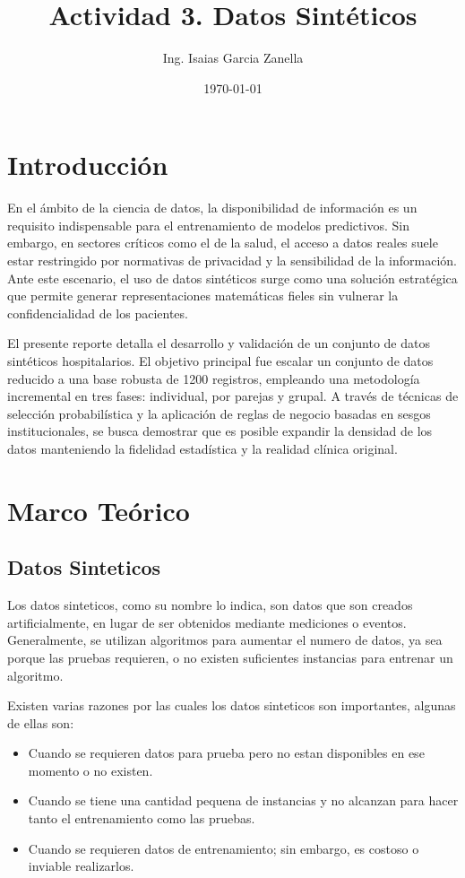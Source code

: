 \documentclass[12pt]{article}
\title{Actividad 3. Datos Sintéticos}
\author{Ing. Isaias Garcia Zanella}
\date{\today}
\begin{document}
\maketitle

\section{Introducción}
En el ámbito de la ciencia de datos, la disponibilidad de información es un requisito indispensable para el entrenamiento de modelos predictivos. Sin embargo, en sectores críticos como el de la salud, el acceso a datos reales suele estar restringido por normativas de privacidad y la sensibilidad de la información. Ante este escenario, el uso de datos sintéticos surge como una solución estratégica que permite generar representaciones matemáticas fieles sin vulnerar la confidencialidad de los pacientes.

El presente reporte detalla el desarrollo y validación de un conjunto de datos sintéticos hospitalarios. El objetivo principal fue escalar un conjunto de datos reducido a una base robusta de 1200 registros, empleando una metodología incremental en tres fases: individual, por parejas y grupal. A través de técnicas de selección probabilística y la aplicación de reglas de negocio basadas en sesgos institucionales, se busca demostrar que es posible expandir la densidad de los datos manteniendo la fidelidad estadística y la realidad clínica original.

\section{Marco Teórico}
\subsection{Datos Sinteticos}
    Los datos sinteticos, como su nombre lo indica, son datos que son creados artificialmente, en lugar
de ser obtenidos mediante mediciones o eventos. Generalmente, se utilizan algoritmos para aumentar el numero 
de datos, ya sea porque las pruebas requieren, o no existen suficientes instancias para entrenar un algoritmo.

Existen varias razones por las cuales los datos sinteticos son importantes, algunas de ellas son:
\begin{itemize}
    \item Cuando se requieren datos para prueba pero no estan disponibles en ese momento o no existen.
    \item Cuando se tiene una cantidad pequena de instancias y no alcanzan para hacer tanto el entrenamiento como las pruebas.
    \item Cuando se requieren datos de entrenamiento; sin embargo, es costoso o inviable realizarlos.
\end{itemize}
\end{document}

